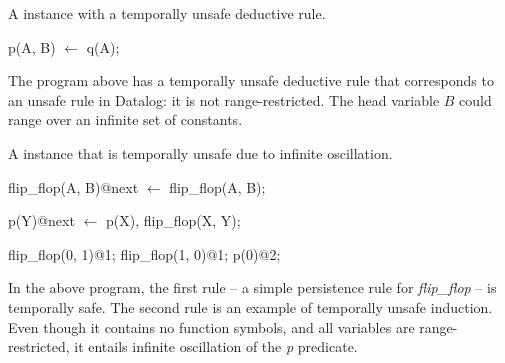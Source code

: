 \begin{example}
A \slang instance with a temporally unsafe deductive rule.

\begin{Dedalus}
p(A, B) \(\leftarrow\) q(A);
\end{Dedalus}

The program above has a temporally unsafe deductive rule that corresponds to an
unsafe rule in Datalog: it is not range-restricted.  The head variable $B$
could range over an infinite set of constants.
\end{example}


\begin{example} 
%
A \slang instance that is temporally unsafe due to infinite oscillation.

\begin{Dedalus}
flip\_flop(A, B)@next \(\leftarrow\) flip\_flop(A, B);

p(Y)@next \(\leftarrow\) p(X), flip\_flop(X, Y);

flip\_flop(0, 1)@1;
flip\_flop(1, 0)@1;
p(0)@2;
\end{Dedalus}

In the above program, the first rule -- a simple persistence rule for
\emph{flip\_flop} -- is temporally safe.  The second rule is an example of
temporally unsafe induction.  Even though it contains no function symbols, and
all variables are range-restricted, it entails infinite oscillation of the
\emph{p} predicate.  
\end{example}




